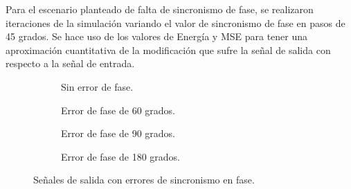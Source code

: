 Para el escenario planteado de falta de sincronismo de fase, se realizaron iteraciones de la simulación variando el valor de sincronismo de fase en pasos de 45 grados.
Se hace uso de los valores de Energía y MSE para tener una aproximación cuantitativa de la modificación que sufre la señal de salida con respecto a la señal de entrada.

\begin{figure}[H]
	\centering
	\begin{subfigure}[b]{0.49\linewidth}
		\def\svgwidth{5cm}
		
		\caption{\scriptsize Sin error de fase.}
		\label{subfig:DFase0}
	\end{subfigure}
	\begin{subfigure}[b]{0.49\linewidth}
		\def\svgwidth{5cm}
		
		\caption{\scriptsize Error de fase de 60 grados.}
		\label{subfig:DFase60}
	\end{subfigure}
	\begin{subfigure}[b]{0.49\linewidth}
		\def\svgwidth{5cm}
		
		\caption{\scriptsize Error de fase de 90 grados.}
		\label{subfig:DFase90}
	\end{subfigure}
	\begin{subfigure}[b]{0.49\linewidth}
		\def\svgwidth{5cm}
		
		\caption{\scriptsize Error de fase de 180 grados.}
		\label{subfig:DFase180}
	\end{subfigure}
	\vspace{-3mm}
	\caption{\scriptsize Señales de salida con errores de sincronismo en fase.}
	\label{fig:graficasfase}
	\vspace{-5mm}
\end{figure}

